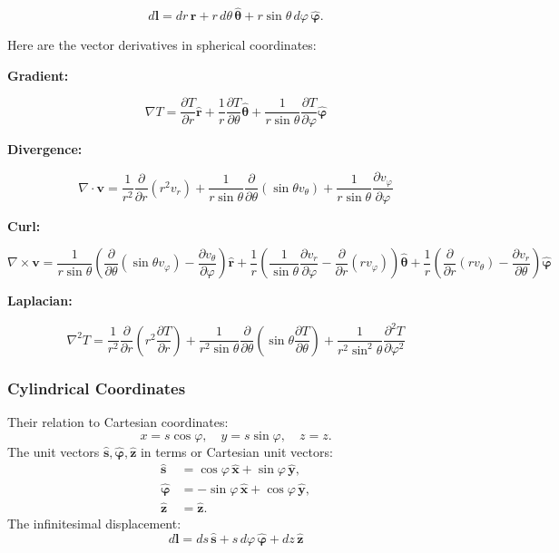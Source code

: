 \documentclass[12pt]{book}
\begin{document}
\[
d\mathbf{l} = dr \, \mathbf{\hat{r}} + r \, d\theta \, \mathbf{\hat{\theta}} + r \sin \theta \, d\varphi \, \mathbf{\hat{\varphi}}.
\]

Here are the vector derivatives in spherical coordinates:

\textbf{Gradient:}

\[
\nabla T = \frac{\partial T}{\partial r} \mathbf{\hat{r}} + \frac{1}{r} \frac{\partial T}{\partial \theta} \mathbf{\hat{\theta}} + \frac{1}{r \sin \theta} \frac{\partial T}{\partial \varphi} \mathbf{\hat{\varphi}}
\]

\textbf{Divergence:}

\[
\nabla \cdot \mathbf{v} = \frac{1}{r^2} \frac{\partial}{\partial r} (r^2 v_r) + \frac{1}{r \sin \theta} \frac{\partial}{\partial \theta} (\sin \theta v_\theta) + \frac{1}{r \sin \theta} \frac{\partial v_\varphi}{\partial \varphi}
\]

\textbf{Curl:}

\[
\nabla \times \mathbf{v} = \frac{1}{r \sin \theta} \left( \frac{\partial}{\partial \theta} (\sin \theta v_\varphi) - \frac{\partial v_\theta}{\partial \varphi} \right) \mathbf{\hat{r}} + \frac{1}{r} \left( \frac{1}{\sin \theta} \frac{\partial v_r}{\partial \varphi} - \frac{\partial}{\partial r} (r v_\varphi) \right) \mathbf{\hat{\theta}} + \frac{1}{r} \left( \frac{\partial}{\partial r} (r v_\theta) - \frac{\partial v_r}{\partial \theta} \right) \mathbf{\hat{\varphi}}
\]

\textbf{Laplacian:}

\[
\nabla^2 T = \frac{1}{r^2} \frac{\partial}{\partial r} \left( r^2 \frac{\partial T}{\partial r} \right) + \frac{1}{r^2 \sin \theta} \frac{\partial}{\partial \theta} \left( \sin \theta \frac{\partial T}{\partial \theta} \right) + \frac{1}{r^2 \sin^2 \theta} \frac{\partial^2 T}{\partial \varphi^2}
\]

\subsubsection{Cylindrical Coordinates}
Their relation to Cartesian coordinates:
\[
x = s \cos \varphi, \quad
y = s \sin \varphi, \quad
z = z.
\]
The unit vectors $\mathbf{\hat{s}, \hat{\varphi}, \hat{z}}$ in terms or Cartesian unit vectors:
\begin{align*}
\mathbf{\hat{s}} &= \cos \varphi \, \mathbf{\hat{x}} + \sin \varphi \, \mathbf{\hat{y}}, \\
\mathbf{\hat{\varphi}} &= -\sin \varphi \, \mathbf{\hat{x}} + \cos \varphi \, \mathbf{\hat{y}}, \\
\mathbf{\hat{z}} &= \mathbf{\hat{z}}.
\end{align*}
The infinitesimal displacement:
\[
d\mathbf{l} = ds \, \mathbf{\hat{s}} + s \, d\varphi \, \mathbf{\hat{\varphi}} + dz \, \mathbf{\hat{z}}
\]
\end{document}
